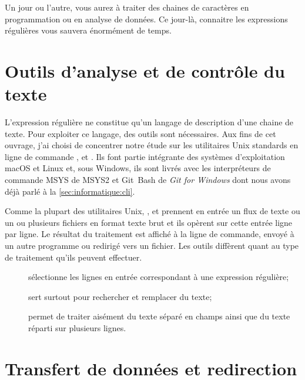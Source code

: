 Un jour ou l'autre, vous aurez à traiter des chaines de caractères en
programmation ou en analyse de données. Ce jour-là, connaitre les
expressions régulières vous sauvera énormément de temps.


\section{Outils d'analyse et de contrôle du texte}
\label{sec:texte:outils}

L'expression régulière ne constitue qu'un langage de description d'une
chaine de texte. Pour exploiter ce langage, des outils sont
nécessaires. Aux fins de cet ouvrage, j'ai choisi de concentrer notre
étude sur les utilitaires Unix standards en ligne de commande
,  et . Ils font partie intégrante des
systèmes d'exploitation macOS et Linux et, sous Windows, ils sont
livrés avec les interpréteurs de commande MSYS de MSYS2
et Git~Bash de \emph{Git for Windows} dont nous avons
déjà parlé à la \autoref{sec:informatique:cli}.

Comme la plupart des utilitaires Unix, ,  et
 prennent en entrée un flux de texte ou un ou plusieurs
fichiers en format texte brut et ils opèrent sur cette entrée ligne
par ligne. Le résultat du traitement est affiché à la ligne de
commande, envoyé à un autre programme ou redirigé vers un fichier. Les
outils diffèrent quant au type de traitement qu'ils peuvent effectuer.
\begin{description}
\item[] sélectionne les lignes en entrée correspondant à
  une expression régulière;
\item[] sert surtout pour rechercher et remplacer du texte;
\item[] permet de traiter aisément du texte séparé en champs
  ainsi que du texte réparti sur plusieurs lignes.
\end{description}



\section{Transfert de données et redirection}
\label{sec:texte:flux}

